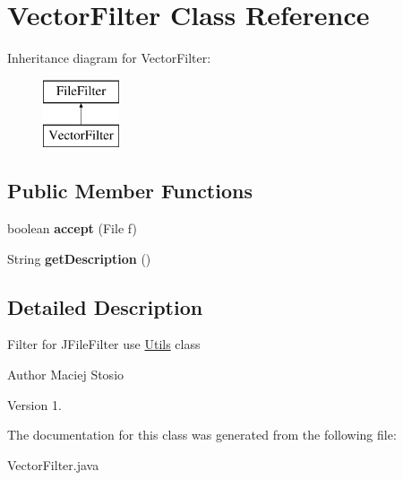 \hypertarget{class_vector_filter}{}\section{Vector\+Filter Class Reference}
\label{class_vector_filter}
Inheritance diagram for Vector\+Filter\+:\begin{figure}[H]
\begin{center}
\leavevmode
\includegraphics[height=2.000000cm]{class_vector_filter}
\end{center}
\end{figure}
\subsection*{Public Member Functions}
\begin{DoxyCompactItemize}
\item 
\mbox{\label{class_vector_filter_a40b658a4acb3b68040d275ff6086a45e}} 
boolean {\bfseries accept} (File f)
\item 
\mbox{\label{class_vector_filter_abbdc1f2d0534ee36d137a34916f4bf29}} 
String {\bfseries get\+Description} ()
\end{DoxyCompactItemize}


\subsection{Detailed Description}
Filter for J\+File\+Filter use \hyperlink{class_utils}{Utils} class \begin{DoxyAuthor}{Author}
Maciej Stosio 
\end{DoxyAuthor}
\begin{DoxyVersion}{Version}
1. 
\end{DoxyVersion}


The documentation for this class was generated from the following file\+:\begin{DoxyCompactItemize}
\item 
Vector\+Filter.\+java\end{DoxyCompactItemize}
